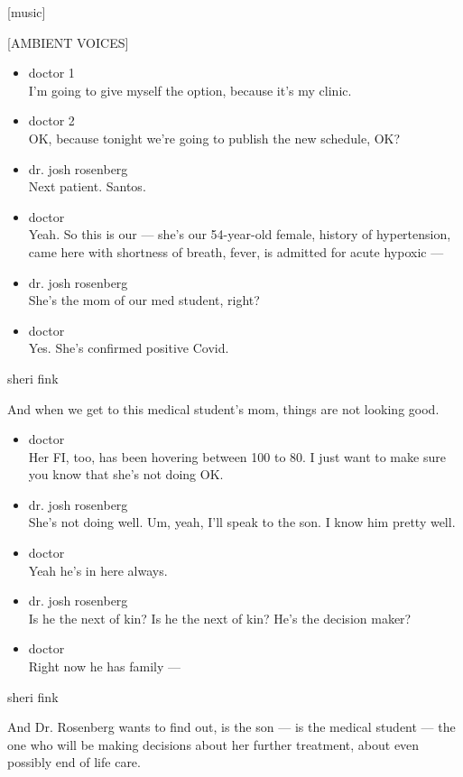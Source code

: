 {[}music{]}

{[}AMBIENT VOICES{]}

\begin{itemize}
\item
  doctor 1\\
  I'm going to give myself the option, because it's my clinic.
\item
  doctor 2\\
  OK, because tonight we're going to publish the new schedule, OK?
\item
  dr. josh rosenberg\\
  Next patient. Santos.
\item
  doctor\\
  Yeah. So this is our --- she's our 54-year-old female, history of
  hypertension, came here with shortness of breath, fever, is admitted
  for acute hypoxic ---
\item
  dr. josh rosenberg\\
  She's the mom of our med student, right?
\item
  doctor\\
  Yes. She's confirmed positive Covid.
\end{itemize}

sheri fink

And when we get to this medical student's mom, things are not looking
good.

\begin{itemize}
\item
  doctor\\
  Her FI, too, has been hovering between 100 to 80. I just want to make
  sure you know that she's not doing OK.
\item
  dr. josh rosenberg\\
  She's not doing well. Um, yeah, I'll speak to the son. I know him
  pretty well.
\item
  doctor\\
  Yeah he's in here always.
\item
  dr. josh rosenberg\\
  Is he the next of kin? Is he the next of kin? He's the decision maker?
\item
  doctor\\
  Right now he has family ---
\end{itemize}

sheri fink

And Dr. Rosenberg wants to find out, is the son --- is the medical
student --- the one who will be making decisions about her further
treatment, about even possibly end of life care.

